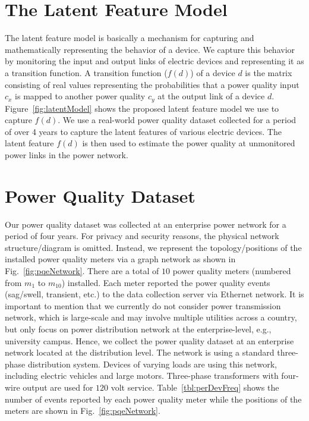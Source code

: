 \section{The Latent Feature Model}
The latent feature model is basically a mechanism for capturing and mathematically representing the behavior of a device. We capture this behavior by monitoring the input and output links of electric devices and representing it as a transition function. A transition function ($f(d)$) of a device $d$ is the matrix consisting of real values representing the probabilities that a power quality input $c_x$ is mapped to another power quality $c_y$ at the output link of a device $d$. Figure~\ref{fig:latentModel} shows the proposed latent feature model we use to capture $f(d)$. We use a real-world power quality dataset collected for a period of over 4 years to capture the latent features of various electric devices. The latent feature $f(d)$ is then used to estimate the power quality at unmonitored power links in the power network.

\section{Power Quality Dataset}
Our power quality dataset was collected at an enterprise power network for a period of four years. For privacy and security reasons, the physical network structure/diagram is omitted. Instead, we represent the topology/positions of the installed power quality meters via a graph network as shown in Fig.~\ref{fig:pqeNetwork}. There are a total of $10$ power quality meters (numbered from $m_1$ to $m_{10}$) installed. Each meter reported the power quality events (sag/swell, transient, etc.) to the data collection server via Ethernet network. It is important to mention that we currently do not consider power transmission network, which is large-scale and may involve multiple utilities across a country, but only focus on power distribution network at the enterprise-level, e.g., university campus. Hence, we collect the power quality dataset at an enterprise network located at the distribution level. The network is using a standard three-phase distribution system. Devices of varying loads are using this network, including electric vehicles and large motors. Three-phase transformers with four-wire output are used for $120$ volt service. Table~\ref{tbl:perDevFreq} shows the number of events reported by each power quality meter while the positions of the meters are shown in Fig.~\ref{fig:pqeNetwork}.

